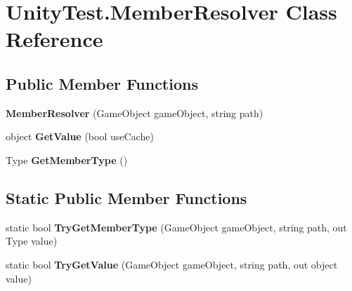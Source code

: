 \hypertarget{class_unity_test_1_1_member_resolver}{}\section{Unity\+Test.\+Member\+Resolver Class Reference}
\label{class_unity_test_1_1_member_resolver}
\subsection*{Public Member Functions}
\begin{DoxyCompactItemize}
\item 
\mbox{\label{class_unity_test_1_1_member_resolver_abcdadb537933948d971987b495653531}} 
{\bfseries Member\+Resolver} (Game\+Object game\+Object, string path)
\item 
\mbox{\label{class_unity_test_1_1_member_resolver_a815847583954de8bb2a3842f88cef77b}} 
object {\bfseries Get\+Value} (bool use\+Cache)
\item 
\mbox{\label{class_unity_test_1_1_member_resolver_a3e5ed17fdc21ce2b3e4ce3fdb85f2398}} 
Type {\bfseries Get\+Member\+Type} ()
\end{DoxyCompactItemize}
\subsection*{Static Public Member Functions}
\begin{DoxyCompactItemize}
\item 
\mbox{\label{class_unity_test_1_1_member_resolver_a6ba998e2f3b560743f1d0d1b894cae00}} 
static bool {\bfseries Try\+Get\+Member\+Type} (Game\+Object game\+Object, string path, out Type value)
\item 
\mbox{\label{class_unity_test_1_1_member_resolver_ab8f62b859938eb5d3adab6af48199553}} 
static bool {\bfseries Try\+Get\+Value} (Game\+Object game\+Object, string path, out object value)
\end{DoxyCompactItemize}
